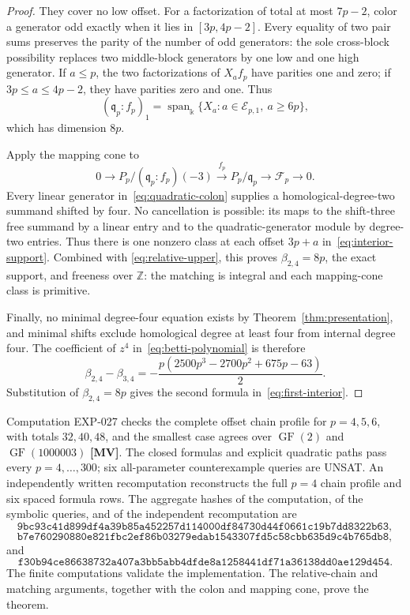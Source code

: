 \documentclass[11pt]{article}
\theoremstyle{definition}
\theoremstyle{remark}
\newcommand{\kfield}{\Bbbk}
\begin{document}
\begin{proof}
They cover no low offset. For a factorization of total at most \(7p-2\), color a generator odd
exactly when it lies in \([3p,4p-2]\). Every equality of two pair sums preserves the parity of
the number of odd generators: the sole cross-block possibility replaces two middle-block
generators by one low and one high generator. If \(a\le p\), the two factorizations of
\(X_af_p\) have parities one and zero; if \(3p\le a\le4p-2\), they have parities zero and one.
Thus
\begin{equation}
(\mathfrak q_p:f_p)_1
=\operatorname{span}_{\kfield}\{X_a:a\in\mathcal E_{p,1},\ a\ge6p\},
\label{eq:quadratic-colon}
\end{equation}
which has dimension \(8p\).

Apply the mapping cone to
\[
0\longrightarrow P_p/(\mathfrak q_p:f_p)(-3)
\xrightarrow{\ f_p\ }P_p/\mathfrak q_p
\longrightarrow\mathcal F_p\longrightarrow0.
\]
Every linear generator in~\eqref{eq:quadratic-colon} supplies a homological-degree-two summand
shifted by four. No cancellation is possible: its maps to the shift-three free summand by a
linear entry and to the quadratic-generator module by degree-two entries. Thus there is one
nonzero class at each offset \(3p+a\) in~\eqref{eq:interior-support}. Combined with
\eqref{eq:relative-upper}, this proves \(\beta_{2,4}=8p\), the exact support, and freeness over
\(\mathbb Z\): the matching is integral and each mapping-cone class is primitive.

Finally, no minimal degree-four equation exists by Theorem~\ref{thm:presentation}, and minimal
shifts exclude homological degree at least four from internal degree four. The coefficient of
\(z^4\) in~\eqref{eq:betti-polynomial} is therefore
\[
\beta_{2,4}-\beta_{3,4}
=-\frac{p(2500p^3-2700p^2+675p-63)}{2}.
\]
Substitution of \(\beta_{2,4}=8p\) gives the second formula in~\eqref{eq:first-interior}.
\end{proof}

Computation EXP-027 checks the complete offset chain profile for \(p=4,5,6\), with totals
\(32,40,48\), and the smallest case agrees over \(\operatorname{GF}(2)\) and
\(\operatorname{GF}(1000003)\) \textbf{[MV]}. The closed formulas and explicit quadratic paths
pass every \(p=4,\ldots,300\); six all-parameter counterexample queries are UNSAT. An independently
written recomputation reconstructs the full \(p=4\) chain profile and six spaced formula rows. The
aggregate hashes of the computation, of the symbolic queries, and of the independent
recomputation are
\[
\texttt{9bc93c41d899df4a39b85a452257d114000df84730d44f0661c19b7dd8322b63},
\]
\[
\texttt{b7e760290880e821fbc2ef86b03279edab1543307fd5c58cbb635d9c4b765db8},
\]
and
\[
\texttt{f30b94ce86638732a407a3bb5abb4dfde8a1258441df71a36138dd0ae129d454}.
\]
The finite computations validate the implementation. The relative-chain and matching arguments,
together with the colon and mapping cone, prove the theorem.
\end{document}
